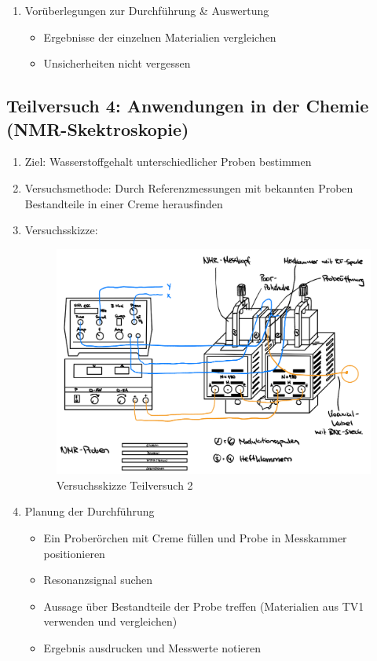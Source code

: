 \documentclass{article}
\begin{document}
\begin{enumerate}[label = (\Roman*)]
    \item Vorüberlegungen zur Durchführung \& Auswertung
        \begin{itemize}
            \item Ergebnisse der einzelnen Materialien vergleichen
            \item Unsicherheiten nicht vergessen
        \end{itemize}
        
\end{enumerate}


\newpage

\subsection{Teilversuch 4: Anwendungen in der Chemie (NMR-Skektroskopie)}
\begin{enumerate}[label = (\Roman*)]
    \item Ziel: Wasserstoffgehalt unterschiedlicher Proben bestimmen
    
    \item Versuchsmethode: Durch Referenzmessungen mit bekannten Proben Bestandteile in einer Creme herausfinden
    
    \item Versuchsskizze:
    
        \begin{figure}[H]
        \centering
        \includegraphics[width=0.7\linewidth]{Abbildungen/TV1-5.jpeg}
        \caption{Versuchsskizze Teilversuch 2}
        \end{figure}

    \item Planung der Durchführung
        \begin{itemize}
           \item Ein Proberörchen mit Creme füllen und Probe in Messkammer positionieren
           \item Resonanzsignal suchen
           \item Aussage über Bestandteile der Probe treffen (Materialien aus TV1 verwenden und vergleichen)
           \item Ergebnis ausdrucken und Messwerte notieren
        \end{itemize}


\end{enumerate}
\end{document}
